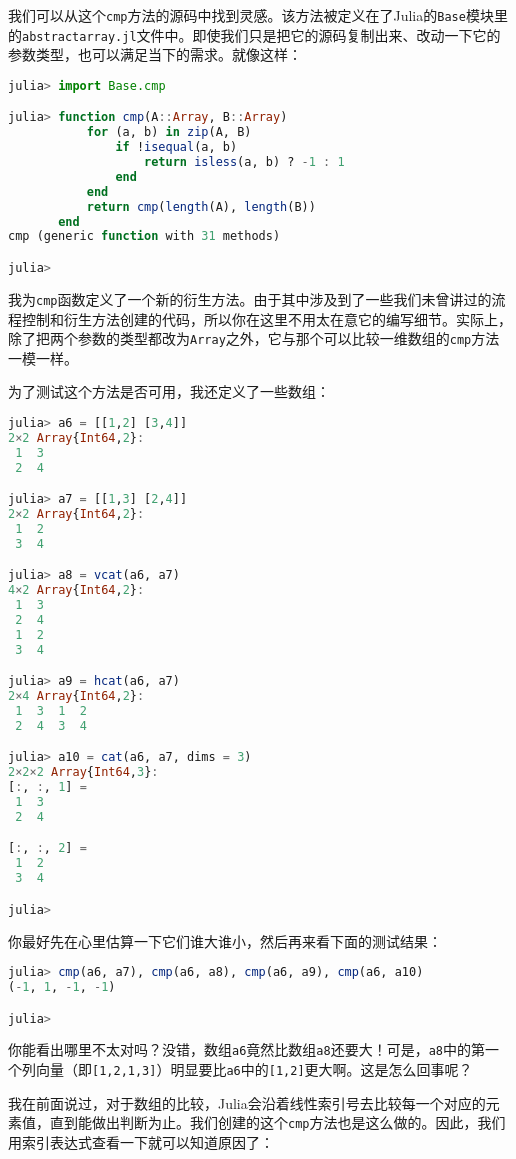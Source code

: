我们可以从这个\verb|cmp|方法的源码中找到灵感。该方法被定义在了Julia的\verb|Base|模块里的\verb|abstractarray.jl|文件中。即使我们只是把它的源码复制出来、改动一下它的参数类型，也可以满足当下的需求。就像这样：

\begin{lstlisting}[language=julia]
julia> import Base.cmp

julia> function cmp(A::Array, B::Array)
           for (a, b) in zip(A, B)
               if !isequal(a, b)
                   return isless(a, b) ? -1 : 1
               end
           end
           return cmp(length(A), length(B))
       end
cmp (generic function with 31 methods)

julia>
\end{lstlisting}

我为\verb|cmp|函数定义了一个新的衍生方法。由于其中涉及到了一些我们未曾讲过的流程控制和衍生方法创建的代码，所以你在这里不用太在意它的编写细节。实际上，除了把两个参数的类型都改为\verb|Array|之外，它与那个可以比较一维数组的\verb|cmp|方法一模一样。

为了测试这个方法是否可用，我还定义了一些数组：

\begin{lstlisting}[language=julia]
julia> a6 = [[1,2] [3,4]]
2×2 Array{Int64,2}:
 1  3
 2  4

julia> a7 = [[1,3] [2,4]]
2×2 Array{Int64,2}:
 1  2
 3  4

julia> a8 = vcat(a6, a7)
4×2 Array{Int64,2}:
 1  3
 2  4
 1  2
 3  4

julia> a9 = hcat(a6, a7)
2×4 Array{Int64,2}:
 1  3  1  2
 2  4  3  4

julia> a10 = cat(a6, a7, dims = 3)
2×2×2 Array{Int64,3}:
[:, :, 1] =
 1  3
 2  4

[:, :, 2] =
 1  2
 3  4

julia> 
\end{lstlisting}

你最好先在心里估算一下它们谁大谁小，然后再来看下面的测试结果：

\begin{lstlisting}[language=julia]
julia> cmp(a6, a7), cmp(a6, a8), cmp(a6, a9), cmp(a6, a10)
(-1, 1, -1, -1)

julia> 
\end{lstlisting}

你能看出哪里不太对吗？没错，数组\verb|a6|竟然比数组\verb|a8|还要大！可是，\verb|a8|中的第一个列向量（即\verb|[1,2,1,3]|）明显要比\verb|a6|中的\verb|[1,2]|更大啊。这是怎么回事呢？

我在前面说过，对于数组的比较，Julia会沿着线性索引号去比较每一个对应的元素值，直到能做出判断为止。我们创建的这个\verb|cmp|方法也是这么做的。因此，我们用索引表达式查看一下就可以知道原因了：

